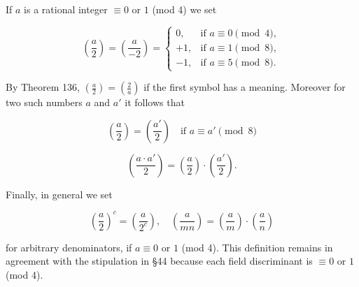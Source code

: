 If $a$ is a rational integer $\equiv 0$ or $1$ (mod 4) we set

$$\left( \frac{a}{2} \right) = \left( \frac{a}{-2} \right) = \begin{cases} 0, & \text{if } a \equiv 0 \pmod{4}, \\ +1, & \text{if } a \equiv 1 \pmod{8}, \\ -1, & \text{if } a \equiv 5 \pmod{8}. \end{cases}$$

By Theorem 136, $\left( \frac{a}{2} \right) = \left( \frac{2}{a} \right)$ if the first symbol has a meaning. Moreover for two such numbers $a$ and $a'$ it follows that

$$\left( \frac{a}{2} \right) = \left( \frac{a'}{2} \right) \quad \text{if } a \equiv a' \pmod{8}$$

$$\left( \frac{a \cdot a'}{2} \right) = \left( \frac{a}{2} \right) \cdot \left( \frac{a'}{2} \right).$$

Finally, in general we set

$$\left( \frac{a}{2} \right)^c = \left( \frac{a}{2^c} \right), \quad \left( \frac{a}{mn} \right) = \left( \frac{a}{m} \right) \cdot \left( \frac{a}{n} \right)$$

for arbitrary denominators, if $a \equiv 0$ or $1$ (mod 4). This definition remains in agreement with the stipulation in §44 because each field discriminant is $\equiv 0$ or $1$ (mod 4).
